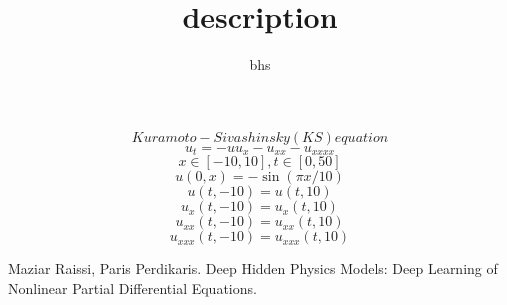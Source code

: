 \documentclass[12pt]{amsart}
\title{description}
\author{bhs}
\begin{document}
\maketitle

$$Kuramoto-Sivashinsky (KS) equation$$
$$ u_t = - u u_x - u_{xx} - u_{xxxx}$$
$$x\in [-10,10] ,t \in [0,50]$$
$$u(0,x) = -\sin(\pi x/10)$$
$$u(t,-10) = u(t,10)$$
$$u_x(t,-10) = u_x(t,10)$$
$$u_{xx}(t,-10) = u_{xx}(t,10)$$
$$u_{xxx}(t,-10) = u_{xxx}(t,10)$$


\begin{thebibliography}{10}
 Maziar Raissi, Paris Perdikaris. Deep Hidden Physics Models: Deep Learning of Nonlinear Partial Differential Equations.
\end{thebibliography}
\end{document}
